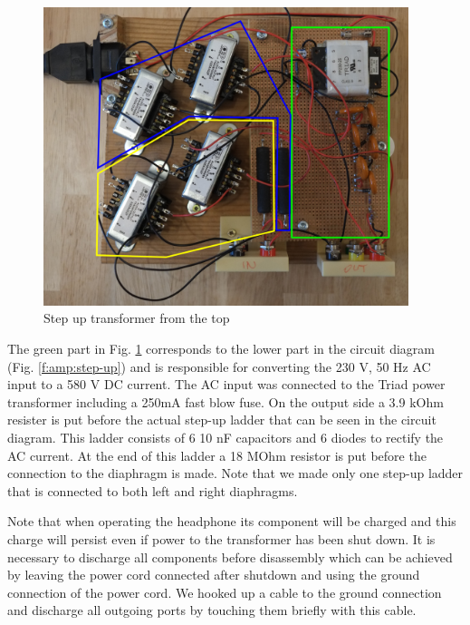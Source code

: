 \documentclass{article}
\begin{document}
\begin{figure}[htb]
    \centering
    \includegraphics[width=0.95\textwidth]{images/step-up-real-top.png}
    \caption{Step up transformer from the top}
    \label{f:amp:step-up-real}
\end{figure}

The green part in Fig. \ref{f:amp:step-up-real} corresponds to the lower part in the circuit diagram (Fig. \ref{f:amp:step-up}) and is responsible for converting the 230 V, 50 Hz AC input to a 580 V DC current. The AC input was connected to the Triad power transformer including a 250mA fast blow fuse. On the output side a 3.9 kOhm resister is put before the actual step-up ladder that can be seen in the circuit diagram. This ladder consists of 6 10 nF capacitors and 6 diodes to rectify the AC current. At the end of this ladder a 18 MOhm resistor is put before the connection to the diaphragm is made. Note that we made only one step-up ladder that is connected to both left and right diaphragms.

Note that when operating the headphone its component will be charged and this charge will persist even if power to the transformer has been shut down. It is necessary to discharge all components before disassembly which can be achieved by leaving the power cord connected after shutdown and using the ground connection of the power cord. We hooked up a cable to the ground connection and discharge all outgoing ports by touching them briefly with this cable.

%
%
%
%
\end{document}
